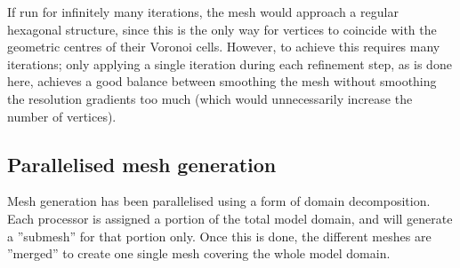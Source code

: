 \documentclass{article}
\begin{document}
If run for infinitely many iterations, the mesh would approach a regular hexagonal structure, since this is the only way for vertices to coincide with the geometric centres of their Voronoi cells. However, to achieve this requires many iterations; only applying a single iteration during each refinement step, as is done here, achieves a good balance between smoothing the mesh without smoothing the resolution gradients too much (which would unnecessarily increase the number of vertices).

\newpage
\subsection{Parallelised mesh generation}

Mesh generation has been parallelised using a form of domain decomposition. Each processor is assigned a portion of the total model domain, and will generate a ''submesh'' for that portion only. Once this is done, the different meshes are ''merged'' to create one single mesh covering the whole model domain.
\end{document}
